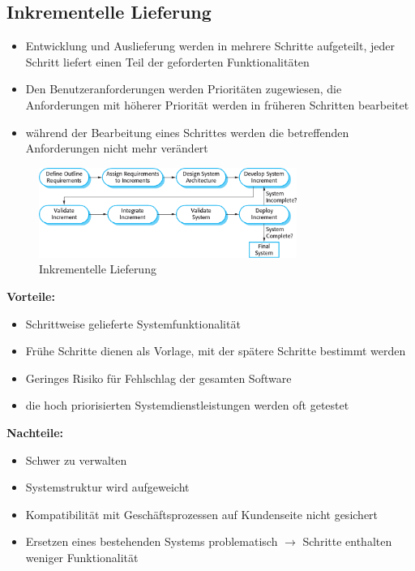 \subsection{Inkrementelle Lieferung}
\begin{itemize}
    \item Entwicklung und Auslieferung werden in mehrere Schritte aufgeteilt, jeder Schritt liefert einen Teil der geforderten Funktionalitäten
    \item Den Benutzeranforderungen werden Prioritäten zugewiesen, die Anforderungen mit höherer Priorität werden in früheren Schritten bearbeitet 
    \item während der Bearbeitung eines Schrittes werden die betreffenden Anforderungen nicht mehr verändert
\end{itemize}
\begin{figure}[h] 
  \centering
     \includegraphics[width=0.75\textwidth]{mainmatter/pics/inkrement_delivery.png}
  \caption{Inkrementelle Lieferung}
\end{figure}
\textbf{Vorteile:}
\begin{itemize}
    \item Schrittweise gelieferte Systemfunktionalität
    \item Frühe Schritte dienen als Vorlage, mit der spätere Schritte bestimmt werden
    \item Geringes Risiko für Fehlschlag der gesamten Software 
    \item die hoch priorisierten Systemdienstleistungen werden oft getestet
\end{itemize}
\textbf{Nachteile:}
\begin{itemize}
    \item Schwer zu verwalten
\item  Systemstruktur wird aufgeweicht
\item  Kompatibilität mit Geschäftsprozessen auf Kundenseite nicht gesichert
\item  Ersetzen eines bestehenden Systems problematisch $\rightarrow$ Schritte enthalten weniger Funktionalität
\end{itemize}

